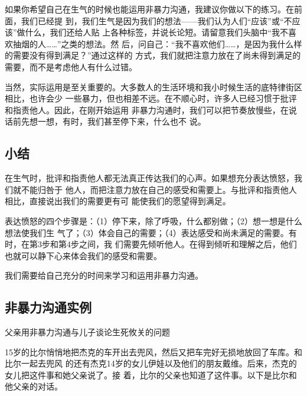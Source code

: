 \documentclass{ctexart}
\begin{document}
如果你希望自己在生气的时候也能运用非暴力沟通，我建议你做以下的练习。在前面，我们已经提
到，我们生气是因为我们的想法------我们认为人们``应该''或``不应该''做什么，我们还给人贴
上各种标签，并说长论短。请留意我们头脑中``我不喜欢抽烟的人\ldots\ldots''之类的想法。然
后，问自己：``我不喜欢他们\ldots\ldots，是因为我什么样的需要没有得到满足？''通过这样的
方式，我们就把注意力放在了尚未得到满足的需要，而不是考虑他人有什么过错。

当然，实际运用是至关重要的。大多数人的生活环境和我小时候生活的底特律街区相比，也许会少
一些暴力，但也相差不远。在不顺心时，许多人已经习惯于批评和指责他人。因此，在刚开始运用
非暴力沟通时，我们可以把节奏放慢些，在说话前先想一想，有时，我们甚至停下来，什么也不
说。


\subsection{小结}

在生气时，批评和指责他人都无法真正传达我们的心声。如果想充分表达愤怒，我们就不能归咎于
他人，而把注意力放在自己的感受和需要上。与批评和指责他人相比，直接说出我们的需要更有可
能使我们的愿望得到满足。

表达愤怒的四个步骤是：（1）停下来，除了呼吸，什么都别做；（2）想一想是什么想法使我们生
气了；（3）体会自己的需要；（4）表达感受和尚未满足的需要。有时，在第3步和第4步之间，我
们需要先倾听他人。在得到倾听和理解之后，他们也就可以静下心来体会我们的感受和需要。

我们需要给自己充分的时间来学习和运用非暴力沟通。

\subsection{非暴力沟通实例}

父亲用非暴力沟通与儿子谈论生死攸关的问题

15岁的比尔悄悄地把杰克的车开出去兜风，然后又把车完好无损地放回了车库。和比尔一起去兜风
的还有杰克14岁的女儿伊娃以及他们的朋友戴维。后来，杰克的女儿把这件事和她父亲说了。接
着，比尔的父亲也知道了这件事。以下是比尔和他父亲的对话。
\end{document}
